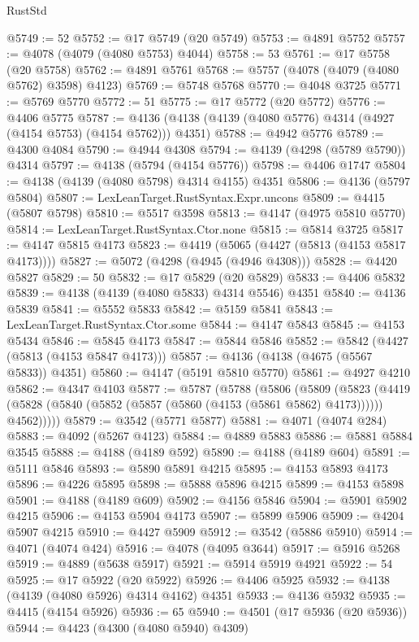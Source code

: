 \begin{lexlean}{RustStd}
\begin{coremodule}
@5749 := 52
@5752 := @17 @5749 (@20 @5749)
@5753 := @4891 @5752
@5757 := @4078 (@4079 (@4080 @5753) @4044)
@5758 := 53
@5761 := @17 @5758 (@20 @5758)
@5762 := @4891 @5761
@5768 := @5757 (@4078 (@4079 (@4080 @5762) @3598) @4123)
@5769 := @5748 @5768
@5770 := @4048 @3725
@5771 := @5769 @5770
@5772 := 51
@5775 := @17 @5772 (@20 @5772)
@5776 := @4406 @5775
@5787 := @4136 (@4138 (@4139 (@4080 @5776) @4314 (@4927 (@4154 @5753) (@4154 @5762))) @4351)
@5788 := @4942 @5776
@5789 := @4300 @4084
@5790 := @4944 @4308
@5794 := @4139 (@4298 (@5789 @5790)) @4314
@5797 := @4138 (@5794 (@4154 @5776))
@5798 := @4406 @1747
@5804 := @4138 (@4139 (@4080 @5798) @4314 @4155) @4351
@5806 := @4136 (@5797 @5804)
@5807 := LexLeanTarget.RustSyntax.Expr.uncons
@5809 := @4415 (@5807 @5798)
@5810 := @5517 @3598
@5813 := @4147 (@4975 @5810 @5770)
@5814 := LexLeanTarget.RustSyntax.Ctor.none
@5815 := @5814 @3725
@5817 := @4147 @5815 @4173
@5823 := @4419 (@5065 (@4427 (@5813 (@4153 @5817 @4173))))
@5827 := @5072 (@4298 (@4945 (@4946 @4308)))
@5828 := @4420 @5827
@5829 := 50
@5832 := @17 @5829 (@20 @5829)
@5833 := @4406 @5832
@5839 := @4138 (@4139 (@4080 @5833) @4314 @5546) @4351
@5840 := @4136 @5839
@5841 := @5552 @5833
@5842 := @5159 @5841
@5843 := LexLeanTarget.RustSyntax.Ctor.some
@5844 := @4147 @5843
@5845 := @4153 @5434
@5846 := @5845 @4173
@5847 := @5844 @5846
@5852 := @5842 (@4427 (@5813 (@4153 @5847 @4173)))
@5857 := @4136 (@4138 (@4675 (@5567 @5833)) @4351)
@5860 := @4147 (@5191 @5810 @5770)
@5861 := @4927 @4210
@5862 := @4347 @4103
@5877 := @5787
    (@5788
      (@5806
        (@5809
          (@5823
            (@4419 (@5828 (@5840 (@5852 (@5857 (@5860 (@4153 (@5861 @5862) @4173)))))) @4562)))))
@5879 := @3542 (@5771 @5877)
@5881 := @4071 (@4074 @284)
@5883 := @4092 (@5267 @4123)
@5884 := @4889 @5883
@5886 := @5881 @5884 @3545
@5888 := @4188 (@4189 @592)
@5890 := @4188 (@4189 @604)
@5891 := @5111 @5846
@5893 := @5890 @5891 @4215
@5895 := @4153 @5893 @4173
@5896 := @4226 @5895
@5898 := @5888 @5896 @4215
@5899 := @4153 @5898
@5901 := @4188 (@4189 @609)
@5902 := @4156 @5846
@5904 := @5901 @5902 @4215
@5906 := @4153 @5904 @4173
@5907 := @5899 @5906
@5909 := @4204 @5907 @4215
@5910 := @4427 @5909
@5912 := @3542 (@5886 @5910)
@5914 := @4071 (@4074 @424)
@5916 := @4078 (@4095 @3644)
@5917 := @5916 @5268
@5919 := @4889 (@5638 @5917)
@5921 := @5914 @5919 @4921
@5922 := 54
@5925 := @17 @5922 (@20 @5922)
@5926 := @4406 @5925
@5932 := @4138 (@4139 (@4080 @5926) @4314 @4162) @4351
@5933 := @4136 @5932
@5935 := @4415 (@4154 @5926)
@5936 := 65
@5940 := @4501 (@17 @5936 (@20 @5936))
@5944 := @4423 (@4300 (@4080 @5940) @4309)

\end{coremodule}
\end{lexlean}
